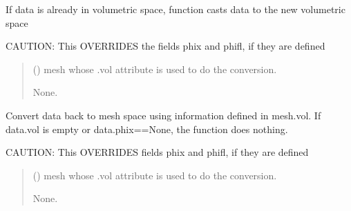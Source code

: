 \documentclass[letterpaper,10pt,english]{sphinxmanual}
\begin{document}
\begin{fulllineitems}
\begin{fulllineitems}
\sphinxAtStartPar
If data is already in volumetric space, function casts data to the new volumetric space

\sphinxAtStartPar
CAUTION: This OVERRIDES the fields phix and phifl, if they are defined
\begin{quote}\begin{description}
\sphinxAtStartPar
{} () \textendash{} mesh whose .vol attribute is used to do the conversion.

\sphinxAtStartPar
None.

\end{description}\end{quote}

\end{fulllineitems}


\begin{fulllineitems}
\label{\detokenize{_autosummary/nirfasterff.base.data.flTPSFdata:nirfasterff.base.data.flTPSFdata.tomesh}}
\pysigstartsignatures
\pysiglinewithargsret
{}
{}
{}
\pysigstopsignatures
\sphinxAtStartPar
Convert data back to mesh space using information defined in mesh.vol. If data.vol is empty or data.phix==None, the function does nothing.

\sphinxAtStartPar
CAUTION: This OVERRIDES fields phix and phifl, if they are defined
\begin{quote}\begin{description}
\sphinxAtStartPar
{} () \textendash{} mesh whose .vol attribute is used to do the conversion.

\sphinxAtStartPar
None.

\end{description}\end{quote}

\end{fulllineitems}


\end{fulllineitems}


\sphinxstepscope
\end{document}
